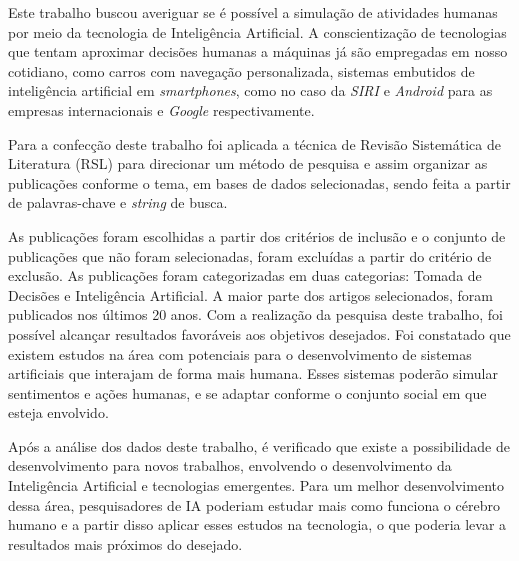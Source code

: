 Este trabalho buscou averiguar se é possível a simulação de atividades humanas por meio da tecnologia de Inteligência Artificial. A conscientização de tecnologias que tentam aproximar decisões humanas a máquinas já são empregadas em nosso cotidiano, como carros com navegação personalizada, sistemas embutidos de inteligência artificial em \textit{smartphones}, como no caso da \textit{SIRI} e \textit{Android} para as empresas internacionais  e \textit{Google} respectivamente.

Para a confecção deste trabalho foi aplicada a técnica de Revisão Sistemática de Literatura (RSL) para direcionar um método de pesquisa e assim organizar as publicações conforme o tema, em bases de dados selecionadas, sendo feita a partir de palavras-chave e \textit{string} de busca.

As publicações foram escolhidas a partir dos critérios de inclusão e o conjunto de publicações que não foram selecionadas, foram excluídas a partir do critério de exclusão. As publicações foram categorizadas em duas categorias: Tomada de Decisões e Inteligência Artificial. A maior parte dos artigos selecionados, foram publicados nos últimos 20 anos. Com a realização da pesquisa deste trabalho, foi possível alcançar resultados favoráveis aos objetivos desejados. Foi constatado que existem estudos na área com potenciais para o desenvolvimento de sistemas artificiais que interajam de forma mais humana. Esses sistemas poderão simular sentimentos e ações humanas, e se adaptar conforme o conjunto social em que esteja envolvido.

Após a análise dos dados deste trabalho, é verificado que existe a possibilidade de desenvolvimento para novos trabalhos, envolvendo o desenvolvimento da Inteligência Artificial e tecnologias emergentes. Para um melhor desenvolvimento dessa área, pesquisadores de IA poderiam estudar mais como funciona o cérebro humano e a partir disso aplicar esses estudos na tecnologia, o que poderia levar a resultados mais próximos do desejado.